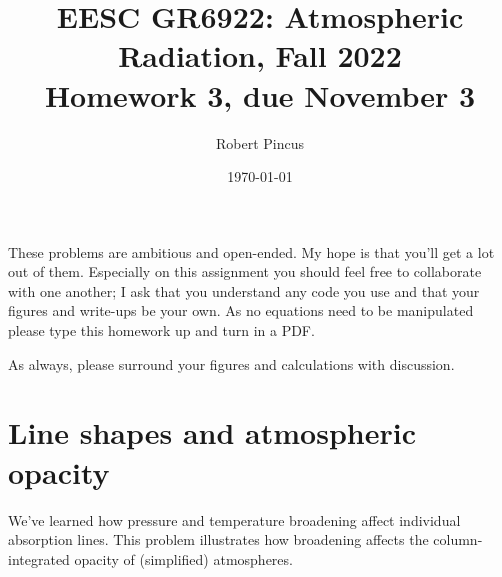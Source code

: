 \documentclass{article}
\title{EESC GR6922: Atmospheric Radiation, Fall 2022 \\  Homework 3, due November 3}
\author{Robert Pincus}
\date{\today}
\begin{document}
\maketitle
These problems are  ambitious and open-ended. My hope is that you'll get a lot out of them. Especially on this assignment you should feel free to collaborate with one another; I ask that you understand any code you use and that your figures and write-ups be your own. As no equations need to be manipulated please type this homework up and turn in a PDF. 

As always, please surround your figures and calculations with discussion. 

\section{Line shapes and atmospheric opacity}

We've learned how pressure and temperature broadening affect individual absorption lines. This problem illustrates how broadening affects the column-integrated opacity of (simplified) atmospheres. 
\end{document}
